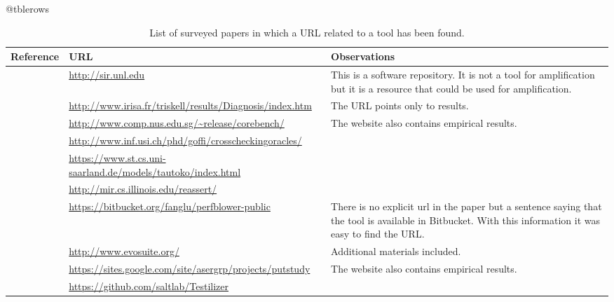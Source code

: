 \expandafter\let\csname c@tblerows\endcsname\rownum

\begin{table*}[ht]
    \caption{List of surveyed papers in which a URL related to a tool has been found.}
    \label{tab:table:tools:urls}
    \centering
    \small
    \begin{tabularx}{\textwidth}{lXX}
	    \toprule
	    Reference & URL & Observations \\
	    \midrule
	    \cite{SIR}                                & \url{http://sir.unl.edu}                                          & This is a software repository. It is not a tool for amplification but it is a resource that could be used for amplification.\\
	    \cite{Baudry:2006:ITS:1134285.1134299}    & \url{http://www.irisa.fr/triskell/results/Diagnosis/index.htm}    & The URL points only to results. \\
	    \cite{bohme2014corebench}                 & \url{http://www.comp.nus.edu.sg/~release/corebench/}              & The website also contains empirical results.\\
	    \cite{Carzaniga:2014:COI:2568225.2568287} & \url{http://www.inf.usi.ch/phd/goffi/crosscheckingoracles/}       & \\
	    \cite{Dallmeier2010}                      & \url{https://www.st.cs.uni-saarland.de/models/tautoko/index.html} & \\
	    \cite{reassert2009}                       & \url{http://mir.cs.illinois.edu/reassert/}                        & \\
	    \cite{fang2015perfblower}                 & \url{https://bitbucket.org/fanglu/perfblower-public}              & There is no explicit url in the paper but a sentence saying that the tool is available in Bitbucket. With this information it was easy to find the URL. \\
	    \cite{fraser2011evosuite}                 & \url{http://www.evosuite.org/}                                    & Additional materials included. \\
	    \cite{marri2010retrofitting}              & \url{https://sites.google.com/site/asergrp/projects/putstudy}     & The website also contains empirical results.\\
	    \cite{milani2014}                         & \url{https://github.com/saltlab/Testilizer}                       & \\

\end{tabularx}
\end{table*}
